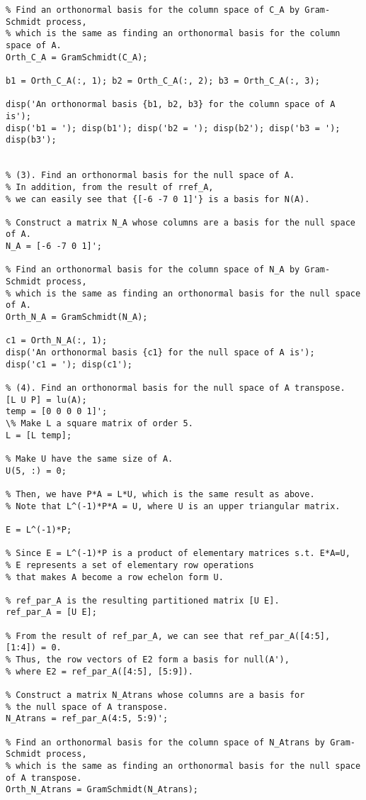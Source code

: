 \begin{sol}
\begin{verbatim}
% Find an orthonormal basis for the column space of C_A by Gram-Schmidt process,
% which is the same as finding an orthonormal basis for the column space of A.
Orth_C_A = GramSchmidt(C_A);

b1 = Orth_C_A(:, 1); b2 = Orth_C_A(:, 2); b3 = Orth_C_A(:, 3);

disp('An orthonormal basis {b1, b2, b3} for the column space of A is');
disp('b1 = '); disp(b1'); disp('b2 = '); disp(b2'); disp('b3 = '); disp(b3');


% (3). Find an orthonormal basis for the null space of A.
% In addition, from the result of rref_A,
% we can easily see that {[-6 -7 0 1]'} is a basis for N(A).

% Construct a matrix N_A whose columns are a basis for the null space of A.
N_A = [-6 -7 0 1]';

% Find an orthonormal basis for the column space of N_A by Gram-Schmidt process,
% which is the same as finding an orthonormal basis for the null space of A.
Orth_N_A = GramSchmidt(N_A);

c1 = Orth_N_A(:, 1);
disp('An orthonormal basis {c1} for the null space of A is');
disp('c1 = '); disp(c1');

% (4). Find an orthonormal basis for the null space of A transpose.
[L U P] = lu(A);
temp = [0 0 0 0 1]';
\% Make L a square matrix of order 5.
L = [L temp]; 

% Make U have the same size of A.
U(5, :) = 0; 

% Then, we have P*A = L*U, which is the same result as above.
% Note that L^(-1)*P*A = U, where U is an upper triangular matrix.

E = L^(-1)*P;

% Since E = L^(-1)*P is a product of elementary matrices s.t. E*A=U,
% E represents a set of elementary row operations
% that makes A become a row echelon form U.

% ref_par_A is the resulting partitioned matrix [U E].
ref_par_A = [U E]; 

% From the result of ref_par_A, we can see that ref_par_A([4:5], [1:4]) = 0.
% Thus, the row vectors of E2 form a basis for null(A'),
% where E2 = ref_par_A([4:5], [5:9]).

% Construct a matrix N_Atrans whose columns are a basis for
% the null space of A transpose.
N_Atrans = ref_par_A(4:5, 5:9)';

% Find an orthonormal basis for the column space of N_Atrans by Gram-Schmidt process,
% which is the same as finding an orthonormal basis for the null space of A transpose.
Orth_N_Atrans = GramSchmidt(N_Atrans);


\end{verbatim}
\end{sol}
